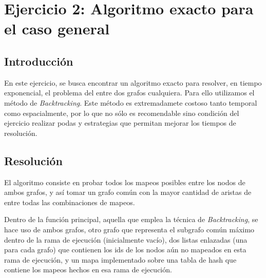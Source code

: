 \section{Ejercicio 2: Algoritmo exacto para el caso general}


\subsection{Introducción}
En este ejercicio, se busca encontrar un algoritmo exacto para resolver, en
tiempo exponencial, el problema del  entre dos grafos cualquiera.
Para ello utilizamos el método de \textit{Backtracking}. Este método es
extremadamete costoso tanto temporal como espacialmente, por lo que no sólo
es recomendable sino condición del ejercicio realizar podas y estrategias que
permitan mejorar los tiempos de resolución.

\subsection{Resolución}
El algoritmo consiste en probar todos los mapeos posibles entre los nodos de
ambos grafos, y así tomar un grafo común con la mayor cantidad de aristas de
entre todas las combinaciones de mapeos.

Dentro de la función principal, aquella que emplea la técnica de
\textit{Backtracking}, se hace uso de ambos grafos, otro grafo que representa
el subgrafo común máximo dentro de la rama de ejecución (inicialmente
vacío), dos listas enlazadas (una para cada grafo) que contienen
los ids de los nodos aún no mapeados en esta rama de ejecución, y un mapa
implementado sobre una tabla de hash que contiene los mapeos hechos en esa
rama de ejecución.

~

